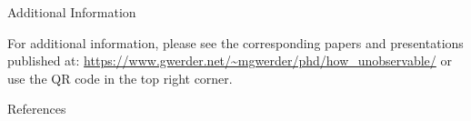 \documentclass[10pt]{beamer}
\newlength{\onecolwid}
\begin{document}
\begin{frame}[t]
\begin{columns}[t]
\begin{column}{\onecolwid}

\begin{block}{Additional Information}
\raggedright
For additional information, please see the corresponding papers and presentations published at: {\footnotesize\href{https://www.gwerder.net/\~mgwerder/phd/how\_unobservable/}{https://www.gwerder.net/\textasciitilde mgwerder/phd/how\_unobservable/}} or use the QR code in the top right corner.

\end{block}


\begin{block}{References}


\end{block}

\end{column} %

\end{columns} %

\end{frame} %
\end{document}
